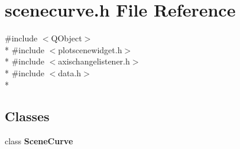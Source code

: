 \section{scenecurve.\+h File Reference}
\label{curve_2scenecurve_8h}
{\ttfamily \#include $<$Q\+Object$>$}\\*
{\ttfamily \#include $<$plotscenewidget.\+h$>$}\\*
{\ttfamily \#include $<$axischangelistener.\+h$>$}\\*
{\ttfamily \#include $<$data.\+h$>$}\\*
\subsection*{Classes}
\begin{DoxyCompactItemize}
\item 
class {\bf Scene\+Curve}
\end{DoxyCompactItemize}
